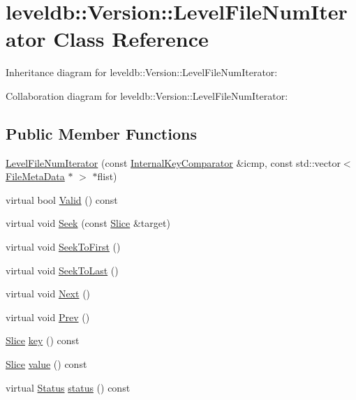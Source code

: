 \hypertarget{classleveldb_1_1_version_1_1_level_file_num_iterator}{}\section{leveldb\+:\+:Version\+:\+:Level\+File\+Num\+Iterator Class Reference}
\label{classleveldb_1_1_version_1_1_level_file_num_iterator}


Inheritance diagram for leveldb\+:\+:Version\+:\+:Level\+File\+Num\+Iterator\+:


Collaboration diagram for leveldb\+:\+:Version\+:\+:Level\+File\+Num\+Iterator\+:
\subsection*{Public Member Functions}
\begin{DoxyCompactItemize}
\item 
\hyperlink{classleveldb_1_1_version_1_1_level_file_num_iterator_a7d9b5b7c74d74974ae322d20535f112a}{Level\+File\+Num\+Iterator} (const \hyperlink{classleveldb_1_1_internal_key_comparator}{Internal\+Key\+Comparator} \&icmp, const std\+::vector$<$ \hyperlink{structleveldb_1_1_file_meta_data}{File\+Meta\+Data} $\ast$ $>$ $\ast$flist)
\item 
virtual bool \hyperlink{classleveldb_1_1_version_1_1_level_file_num_iterator_afb097a457cd972895393b3fbde7e2ad2}{Valid} () const 
\item 
virtual void \hyperlink{classleveldb_1_1_version_1_1_level_file_num_iterator_adbe855f4a783c2f578e1ff2fbb5259b2}{Seek} (const \hyperlink{classleveldb_1_1_slice}{Slice} \&target)
\item 
virtual void \hyperlink{classleveldb_1_1_version_1_1_level_file_num_iterator_a8e5d34bf0c1e17e83bbb9941821a7ee2}{Seek\+To\+First} ()
\item 
virtual void \hyperlink{classleveldb_1_1_version_1_1_level_file_num_iterator_ac7fafc33c049d1e33fdf9b5ae99f73d8}{Seek\+To\+Last} ()
\item 
virtual void \hyperlink{classleveldb_1_1_version_1_1_level_file_num_iterator_a7f470d4bd4dd27ff653bd1e61ccfd759}{Next} ()
\item 
virtual void \hyperlink{classleveldb_1_1_version_1_1_level_file_num_iterator_ab39c60a98d579590231034fdb665cb42}{Prev} ()
\item 
\hyperlink{classleveldb_1_1_slice}{Slice} \hyperlink{classleveldb_1_1_version_1_1_level_file_num_iterator_a8c2ee5f532fd05b2864f8d69d5c01f45}{key} () const 
\item 
\hyperlink{classleveldb_1_1_slice}{Slice} \hyperlink{classleveldb_1_1_version_1_1_level_file_num_iterator_ac09a8ed595aca29d90e6af91e80a4f00}{value} () const 
\item 
virtual \hyperlink{classleveldb_1_1_status}{Status} \hyperlink{classleveldb_1_1_version_1_1_level_file_num_iterator_a98bae41a244b6a5a6675a7f7b322281d}{status} () const 
\end{DoxyCompactItemize}
